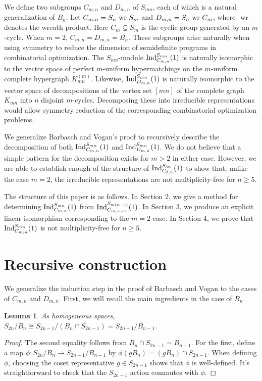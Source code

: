\documentclass[12pt]{amsart}
\newtheorem{lemma}[theorem]{Lemma}
\numberwithin{theorem}{section}
\newcommand{\Ind}{\textup{Ind}}
\newcommand{\wreath}{\textup{ wr }}
\begin{document}
We define two subgroups $C_{m,n}$ and $D_{m,n}$ of $S_{mn}$, each of which is a natural generalization of $B_n$.
Let $C_{m,n} = S_n \wreath S_m$ and $D_{m,n} = S_n \wreath C_m$, where $\wreath$ denotes the wreath product.
Here $C_m \subseteq S_m$ is the cyclic group generated by an $m$-cycle.
When $m=2$, $C_{m,n} = D_{m,n} = B_n$.
These subgroups arise naturally when using symmetry to reduce the dimension of semidefinite programs in combinatorial optimization.
The $S_{mn}$-module $\Ind_{C_{m,n}}^{S_{mn}}(1)$ is naturally isomorphic to the vector space of perfect $m$-uniform hypermatchings on the $m$-uniform complete hypergraph $K^{(m)}_{mn}$.
Likewise, $\Ind_{D_{m,n}}^{S_{mn}}(1)$ is naturally isomorphic to the vector space of decompositions of the vertex set $[mn]$ of the complete graph $K_{mn}$ into $n$ disjoint $m$-cycles.
Decomposing these into irreducible representations would allow symmetry reduction of the corresponding combinatorial optimization problems.

We generalize Barbasch and Vogan's proof to recursively describe the decomposition of both $\Ind_{C_{m,n}}^{S_{mn}}(1)$ and $\Ind_{D_{m,n}}^{S_{mn}}(1)$.
We do not believe that a simple pattern for the decomposition exists for $m > 2$ in either case.
However, we are able to establish enough of the structure of $\Ind_{C_{3,n}}^{S_{3n}}(1)$ to show that, unlike the case $m=2$,
the irreducible representations are not multiplicity-free for $n \ge 5$.

The structure of this paper is as follows.
In Section 2, we give a method for determining $\Ind_{C_{m,n}}^{S_{mn}}(1)$ from $\Ind_{C_{m,n-1}}^{S_{m(n-1)}}(1)$.
In Section 3, we produce an explicit linear isomorphism corresponding to the $m=2$ case.
In Section 4, we prove that $\Ind_{C_{m,n}}^{S_{mn}}(1)$ is not multiplicity-free for $n \ge 5$.

\section{Recursive construction}
We generalize the induction step in the proof of Barbasch and Vogan to the cases of $C_{m,n}$ and $D_{m,n}$.
First, we will recall the main ingredients in the case of $B_n$.

\begin{lemma}\label{BV:lemma1}
As homogeneous spaces, 
$S_{2n}/B_n \cong S_{2n-1}/(B_n \cap S_{2n-1}) = S_{2n-1}/B_{n-1}$.
\end{lemma}
\begin{proof}
The second equality follows from $B_n \cap S_{2n-1} = B_{n-1}$.
For the first, define a map $\phi: S_{2n} / B_n \to S_{2n-1}/B_{n-1}$ by $\phi(gB_n) = (gB_n) \cap S_{2n-1}$.
When defining $\phi$, choosing the coset representative $g \in S_{2n-1}$ shows that $\phi$ is well-defined.
It's straightforward to check that the $S_{2n-1}$ action commutes with $\phi$.
\end{proof}
\end{document}
